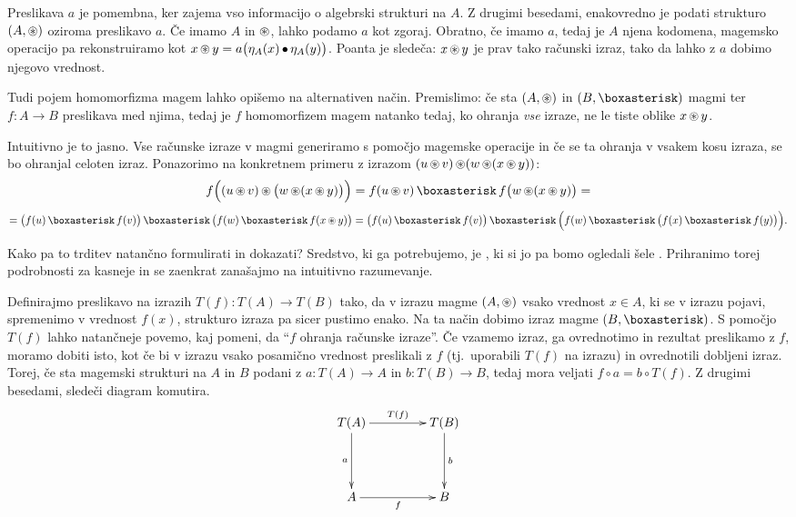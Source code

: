 Preslikava $a$ je pomembna, ker zajema vso informacijo o algebrski strukturi na $A$. Z drugimi besedami, enakovredno je podati strukturo $(A, \mathop{\circledast}\nolimits)$ oziroma preslikavo $a$. Če imamo $A$ in $\mathop{\circledast}\nolimits$, lahko podamo $a$ kot zgoraj. Obratno, če imamo $a$, tedaj je $A$ njena kodomena, magemsko operacijo pa rekonstruiramo kot $x \mathop{\circledast}\nolimits y = a\big(\eta_A(x) \mathop{\bullet}\nolimits \eta_A(y)\big)$. Poanta je sledeča: $x \mathop{\circledast}\nolimits y$ je prav tako računski izraz, tako da lahko z $a$ dobimo njegovo vrednost.

Tudi pojem homomorfizma magem lahko opišemo na alternativen način. Premislimo: če sta $(A, \mathop{\circledast}\nolimits)$ in $(B, \soper)$ magmi ter $f\colon A \to B$ preslikava med njima, tedaj je $f$ homomorfizem magem natanko tedaj, ko ohranja \emph{vse} izraze, ne le tiste oblike $x \mathop{\circledast}\nolimits y$.

Intuitivno je to jasno. Vse računske izraze v magmi generiramo s pomočjo magemske operacije in če se ta ohranja v vsakem kosu izraza, se bo ohranjal celoten izraz. Ponazorimo na konkretnem primeru z izrazom $(u \mathop{\circledast}\nolimits v) \mathop{\circledast}\nolimits (w \mathop{\circledast}\nolimits (x \mathop{\circledast}\nolimits y))$:
\[f\Big((u \oper v) \oper \big(w \oper (x \oper y)\big)\Big) = f(u \oper v) \soper f\big(w \oper (x \oper y)\big) =\]
\[= \big(f(u) \soper f(v)\big) \soper \big(f(w) \soper f(x \oper y)\big) = \big(f(u) \soper f(v)\big) \soper \Big(f(w) \soper \big(f(x) \soper f(y)\big)\Big).\]

Kako pa to trditev natančno formulirati in dokazati? Sredstvo, ki ga potrebujemo, je , ki si jo pa bomo ogledali šele . Prihranimo torej podrobnosti za kasneje in se zaenkrat zanašajmo na intuitivno razumevanje.

Definirajmo preslikavo na izrazih $T(f)\colon T(A) \to T(B)$ tako, da v izrazu magme $(A, \mathop{\circledast}\nolimits)$ vsako vrednost $x \in A$, ki se v izrazu pojavi, spremenimo v vrednost $f(x)$, strukturo izraza pa sicer pustimo enako. Na ta način dobimo izraz magme $(B, \soper)$. S pomočjo $T(f)$ lahko natančneje povemo, kaj pomeni, da ``$f$ ohranja računske izraze''. Če vzamemo izraz, ga ovrednotimo in rezultat preslikamo z $f$, moramo dobiti isto, kot če bi v izrazu vsako posamično vrednost preslikali z $f$ (tj.~uporabili $T(f)$ na izrazu) in ovrednotili dobljeni izraz. Torej, če sta magemski strukturi na $A$ in $B$ podani z $a\colon T(A) \to A$ in $b\colon T(B) \to B$, tedaj mora veljati $f \circ a = b \circ T(f)$. Z drugimi besedami, sledeči diagram komutira.
\[\xymatrix@+2em{
T(A) \ar[d]_a \ar[r]^{T(f)} & T(B) \ar[d]^b \\
A \ar[r]_{f} & B
}\]

